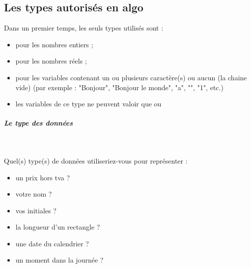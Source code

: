 \documentclass[11pt,a4paper]{article}
\begin{document}
            \par
        \subsection{Les types autoris\'es en algo}
          Dans un premier temps, les seuls types utilis\'es sont :
          
					\begin{itemize}
				
			\item \verb@entier@ pour les nombres entiers ;
			\item {} pour les nombres r\'eels ;
			\item \verb@chaine@ pour les variables contenant un ou plusieurs caract\`ere(s) ou aucun (la chaine vide)
              (par exemple : "Bonjour", "Bonjour le monde", "a", "", "1", etc.)
			\item {} les variables de ce type 
            ne peuvent valoir que \verb@vrai@ ou \verb@faux@
					\end{itemize}
				
            \par
        
			
		\subparagraph{Le type des donn\'ees} 
		
                \textcolor{white}{.} \par
             
								Quel(s) type(s) de donn\'ees utiliseriez-vous pour repr\'esenter :
							
					\begin{itemize}
				
			\item un prix hors tva ? \textcolor{gray}{\underline{\hspace*{3em}}} 
			\item votre nom ?  \textcolor{gray}{\underline{\hspace*{5em}}} 
			\item vos initiales ? \textcolor{gray}{\underline{\hspace*{10em}}} 
			\item la longueur d'un rectangle ?  \textcolor{gray}{\underline{\hspace*{3em}}} 
			\item une date du calendrier ?  \textcolor{gray}{\underline{\hspace*{10em}}} 
			\item un moment dans la journ\'ee ?  \textcolor{gray}{\underline{\hspace*{10em}}} 
					\end{itemize}
\end{document}
